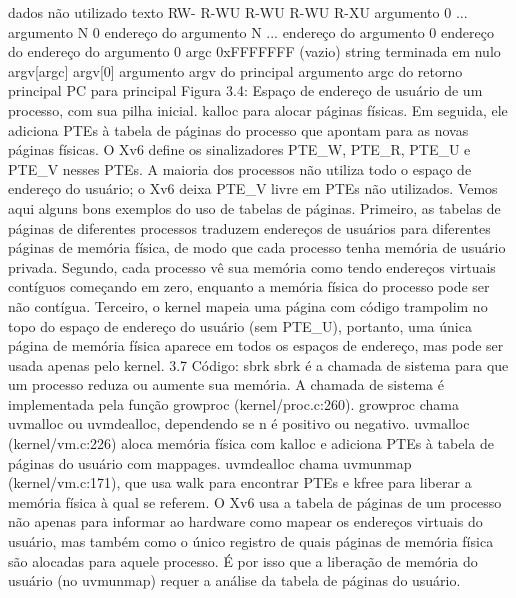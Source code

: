 dados
 não  utilizado
 texto
 RW-
R-WU
R-WU
R-WU
R-XU
 argumento  0
 ...
 argumento  N  0
 endereço  do  argumento  N
 ...
 endereço  do  argumento  0  
endereço  do  endereço  do  
argumento  0  
argc  
0xFFFFFFF
 (vazio)
 string  terminada  em  nulo  argv[argc]
 argv[0]
 argumento  argv  do  principal
 argumento  argc  do  retorno  
principal  PC  para  principal
 Figura  3.4:  Espaço  de  endereço  de  usuário  de  um  processo,  com  sua  pilha  inicial.
 kalloc  para  alocar  páginas  físicas.  Em  seguida,  ele  adiciona  PTEs  à  tabela  de  páginas  do  processo  que  apontam  para  
as  novas  páginas  físicas.  O  Xv6  define  os  sinalizadores  PTE_W,  PTE_R,  PTE_U  e  PTE_V  nesses  PTEs.  A  maioria  
dos  processos  não  utiliza  todo  o  espaço  de  endereço  do  usuário;  o  Xv6  deixa  PTE_V  livre  em  PTEs  não  utilizados.
 Vemos  aqui  alguns  bons  exemplos  do  uso  de  tabelas  de  páginas.  Primeiro,  as  tabelas  de  páginas  de  diferentes  
processos  traduzem  endereços  de  usuários  para  diferentes  páginas  de  memória  física,  de  modo  que  cada  processo  tenha  
memória  de  usuário  privada.  Segundo,  cada  processo  vê  sua  memória  como  tendo  endereços  virtuais  contíguos  começando  
em  zero,  enquanto  a  memória  física  do  processo  pode  ser  não  contígua.  Terceiro,  o  kernel  mapeia  uma  página  com  código  
trampolim  no  topo  do  espaço  de  endereço  do  usuário  (sem  PTE_U),  portanto,  uma  única  página  de  memória  física  aparece  
em  todos  os  espaços  de  endereço,  mas  pode  ser  usada  apenas  pelo  kernel.
 3.7  Código:  sbrk
 sbrk  é  a  chamada  de  sistema  para  que  um  processo  reduza  ou  aumente  sua  memória.  A  chamada  de  sistema  é  
implementada  pela  função  growproc  (kernel/proc.c:260).  growproc  chama  uvmalloc  ou  uvmdealloc,  dependendo  se  n  
é  positivo  ou  negativo.  uvmalloc  (kernel/vm.c:226)  aloca  memória  física  com  kalloc  e  adiciona  PTEs  à  tabela  de  
páginas  do  usuário  com  mappages.  uvmdealloc  chama  uvmunmap  (kernel/vm.c:171),  que  usa  walk  para  encontrar  
PTEs  e  kfree  para  liberar  a  memória  física  à  qual  se  referem.
 O  Xv6  usa  a  tabela  de  páginas  de  um  processo  não  apenas  para  informar  ao  hardware  como  mapear  os  endereços  
virtuais  do  usuário,  mas  também  como  o  único  registro  de  quais  páginas  de  memória  física  são  alocadas  para  aquele  
processo.  É  por  isso  que  a  liberação  de  memória  do  usuário  (no  uvmunmap)  requer  a  análise  da  tabela  de  páginas  do  usuário.
